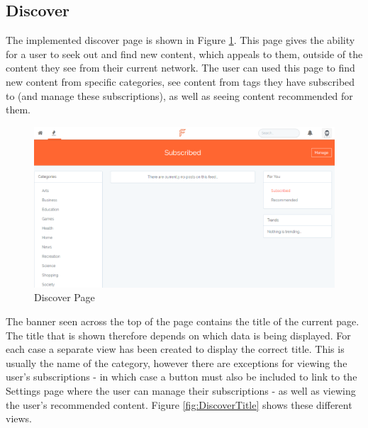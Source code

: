 \subsection{Discover}
The implemented discover page is shown in Figure \ref{fig:DiscoverPage}. This page gives the ability for a user to seek out and find new content, which appeals to them, outside of the content they see from their current network. The user can used this page to find new content from specific categories, see content from tags they have subscribed to (and manage these subscriptions), as well as seeing content recommended for them.

\begin{figure}[H]
\centering
\includegraphics[width=\textwidth]{Images/Implementation/DiscoverPage}
\caption{Discover Page}
\label{fig:DiscoverPage}
\end{figure}
The banner seen across the top of the page contains the title of the current page. The title that is shown therefore depends on which data is being displayed. For each case a separate view has been created to display the correct title. This is usually the name of the category, however there are exceptions for viewing the user's subscriptions - in which case a button must also be included to link to the Settings page where the user can manage their subscriptions - as well as viewing the user's recommended content. Figure \ref{fig:DiscoverTitle} shows these different views.

